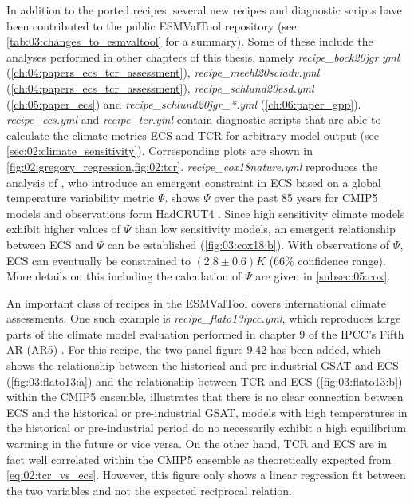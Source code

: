 In addition to the ported recipes, several new recipes and diagnostic scripts
have been contributed to the public \ac{ESMValTool} repository (see
\cref{tab:03:changes_to_esmvaltool} for a summary). Some of these include the
analyses performed in other chapters of this thesis, namely
\emph{recipe\_bock20jgr.yml} (\cref{ch:04:papers_ecs_tcr_assessment}),
\emph{recipe\_meehl20sciadv.yml} (\cref{ch:04:papers_ecs_tcr_assessment}),
\emph{recipe\_schlund20esd.yml} (\cref{ch:05:paper_ecs}) and
\emph{recipe\_schlund20jgr\_*.yml} (\cref{ch:06:paper_gpp}).
\emph{recipe\_ecs.yml} and \emph{recipe\_tcr.yml} contain diagnostic scripts
that are able to calculate the climate metrics \ac{ECS} and \ac{TCR} for
arbitrary model output (see \cref{sec:02:climate_sensitivity}). Corresponding
plots are shown in \cref{fig:02:gregory_regression,fig:02:tcr}.
\emph{recipe\_cox18nature.yml} reproduces the analysis of \textcite{Cox2018},
who introduce an emergent constraint in \ac{ECS} based on a global temperature
variability metric $\Psi$.  shows $\Psi$ over the past 85
years for \acs{CMIP}5 models and observations form HadCRUT4
\autocite{Morice2012}. Since high sensitivity climate models exhibit higher
values of $\Psi$ than low sensitivity models, an emergent relationship between
\ac{ECS} and $\Psi$ can be established (\cref{fig:03:cox18:b}). With
observations of $\Psi$, \ac{ECS} can eventually be constrained to $\left( 2.8
\pm 0.6 \right) \unit{K}$ ($66 \unit{\%}$ confidence range). More details on
this including the calculation of $\Psi$ are given in \cref{subsec:05:cox}.

An important class of recipes in the \ac{ESMValTool} covers international
climate assessments. One such example is \emph{recipe\_flato13ipcc.yml}, which
reproduces large parts of the climate model evaluation performed in chapter 9
of the \ac{IPCC}'s Fifth \acl{AR} (\acs{AR}5) \autocite{Flato2013}. For this
recipe, the two-panel figure 9.42 has been added, which shows the relationship
between the historical and pre-industrial \ac{GSAT} and \ac{ECS}
(\cref{fig:03:flato13:a}) and the relationship between \ac{TCR} and \ac{ECS}
(\cref{fig:03:flato13:b}) within the \acs{CMIP}5 ensemble.
 illustrates that there is no clear connection between
\ac{ECS} and the historical or pre-industrial \ac{GSAT}, \ie{} models with high
temperatures in the historical or pre-industrial period do no necessarily
exhibit a high equilibrium warming in the future or vice versa. On the other
hand, \ac{TCR} and \ac{ECS} are in fact well correlated within the \acs{CMIP}5
ensemble as theoretically expected from \cref{eq:02:tcr_vs_ecs}. However, this
figure only shows a linear regression fit between the two variables and not the
expected reciprocal relation.

